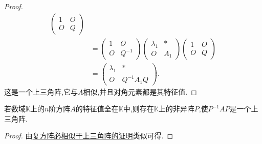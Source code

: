 \documentclass[../../main.tex]{subfiles}%
\begin{document}
\begin{proof}
\begin{align*}
\begin{pmatrix}
1 & O \\
O & Q
\end{pmatrix} \\
&= \begin{pmatrix}
1 & O \\
O & Q^{-1}
\end{pmatrix} \begin{pmatrix}
\lambda_1 & * \\
O & A_1
\end{pmatrix} \begin{pmatrix}
1 & O \\
O & Q
\end{pmatrix} \\
&= \begin{pmatrix}
\lambda_1 & * \\
O & Q^{-1}A_1Q
\end{pmatrix}.
\end{align*}
这是一个上三角阵,它与$A$相似,并且对角元素都是其特征值.
\end{proof}

\begin{corollary}\label{corollary:特征值全在矩阵元素的数域中则一定相似于上三角阵}
若数域$\mathbb{K}$上的$n$阶方阵$A$的特征值全在$\mathbb{K}$中,则存在$\mathbb{K}$上的非异阵$P$,使$P^{-1}AP$是一个上三角阵.
\end{corollary}
\begin{proof}
由\hyperref[theorem:复方阵必相似于上三角阵]{复方阵必相似于上三角阵的证明}类似可得.
\end{proof}
\end{document}
